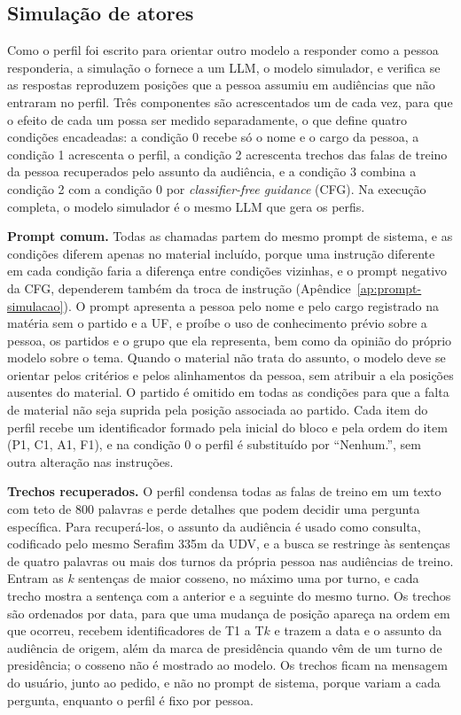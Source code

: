 
\subsection{Simulação de atores}
\label{sec:metodo-simulacao}

Como o perfil foi escrito para orientar outro modelo a responder como a pessoa responderia, a
simulação o fornece a um LLM, o modelo simulador, e verifica se as respostas reproduzem posições que
a pessoa assumiu em audiências que não entraram no perfil. Três componentes são acrescentados um de
cada vez, para que o efeito de cada um possa ser medido separadamente, o que define quatro condições
encadeadas: a condição 0 recebe só o nome e o cargo da pessoa, a condição 1 acrescenta o perfil, a
condição 2 acrescenta trechos das falas de treino da pessoa recuperados pelo assunto da audiência, e
a condição 3 combina a condição 2 com a condição 0 por \textit{classifier-free guidance} (CFG). Na
execução completa, o modelo simulador é o mesmo LLM que gera os perfis.

\textbf{Prompt comum.} Todas as chamadas partem do mesmo prompt de sistema, e as condições diferem
apenas no material incluído, porque uma instrução diferente em cada condição faria a diferença entre
condições vizinhas, e o prompt negativo da CFG, dependerem também da troca de instrução
(Apêndice~\ref{ap:prompt-simulacao}). O prompt apresenta a pessoa pelo nome e pelo cargo registrado
na matéria sem o partido e a UF, e proíbe o uso de conhecimento prévio sobre a pessoa, os partidos e
o grupo que ela representa, bem como da opinião do próprio modelo sobre o tema. Quando o material não
trata do assunto, o modelo deve se orientar pelos critérios e pelos alinhamentos da pessoa, sem
atribuir a ela posições ausentes do material. O partido é omitido em todas as condições para que a
falta de material não seja suprida pela posição associada ao partido. Cada item do perfil recebe um
identificador formado pela inicial do bloco e pela ordem do item (P1, C1, A1, F1), e na condição 0 o
perfil é substituído por ``Nenhum.'', sem outra alteração nas instruções.

\textbf{Trechos recuperados.} O perfil condensa todas as falas de treino em um texto com teto de 800
palavras e perde detalhes que podem decidir uma pergunta específica. Para recuperá-los, o assunto da
audiência é usado como consulta, codificado pelo mesmo Serafim 335m da UDV, e a busca se restringe
às sentenças de quatro palavras ou mais dos turnos da própria pessoa nas audiências de treino. Entram
as $k$ sentenças de maior cosseno, no máximo uma por turno, e cada trecho mostra a sentença com a
anterior e a seguinte do mesmo turno. Os trechos são ordenados por data, para que uma mudança de
posição apareça na ordem em que ocorreu, recebem identificadores de T1 a T$k$ e trazem a data e o
assunto da audiência de origem, além da marca de presidência quando vêm de um turno de presidência;
o cosseno não é mostrado ao modelo. Os trechos ficam na mensagem do usuário, junto ao pedido, e não no
prompt de sistema, porque variam a cada pergunta, enquanto o perfil é fixo por pessoa.

